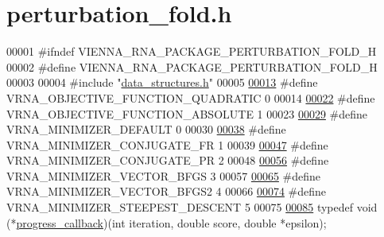 \hypertarget{perturbation__fold_8h_source}{\section{perturbation\+\_\+fold.\+h}
\label{perturbation__fold_8h_source}
}

\begin{DoxyCode}
00001 \textcolor{preprocessor}{#ifndef VIENNA\_RNA\_PACKAGE\_PERTURBATION\_FOLD\_H}
00002 \textcolor{preprocessor}{#define VIENNA\_RNA\_PACKAGE\_PERTURBATION\_FOLD\_H}
00003 
00004 \textcolor{preprocessor}{#include "\hyperlink{data__structures_8h}{data\_structures.h}"}
00005 
\hypertarget{perturbation__fold_8h_source_l00013}{}\hyperlink{group__soft__constraints_ga81e10993d1ae728e4e02022b33155a12}{00013} \textcolor{preprocessor}{#define VRNA\_OBJECTIVE\_FUNCTION\_QUADRATIC 0}
00014 
\hypertarget{perturbation__fold_8h_source_l00022}{}\hyperlink{group__soft__constraints_gac070dfb9cafaeb14d5652bd9adf0f6b1}{00022} \textcolor{preprocessor}{#define VRNA\_OBJECTIVE\_FUNCTION\_ABSOLUTE 1}
00023 
\hypertarget{perturbation__fold_8h_source_l00029}{}\hyperlink{group__soft__constraints_gae5126200d80dbb282f46083fffc606bf}{00029} \textcolor{preprocessor}{#define VRNA\_MINIMIZER\_DEFAULT 0}
00030 
\hypertarget{perturbation__fold_8h_source_l00038}{}\hyperlink{group__soft__constraints_gab1d89db58e8c497795a5005f5dbc8c4a}{00038} \textcolor{preprocessor}{#define VRNA\_MINIMIZER\_CONJUGATE\_FR 1}
00039 
\hypertarget{perturbation__fold_8h_source_l00047}{}\hyperlink{group__soft__constraints_ga5aaeafe1b0aa77a5cda18943ff94b02f}{00047} \textcolor{preprocessor}{#define VRNA\_MINIMIZER\_CONJUGATE\_PR 2}
00048 
\hypertarget{perturbation__fold_8h_source_l00056}{}\hyperlink{group__soft__constraints_ga9be8a702cddf58235571ace11cc41b22}{00056} \textcolor{preprocessor}{#define VRNA\_MINIMIZER\_VECTOR\_BFGS 3}
00057 
\hypertarget{perturbation__fold_8h_source_l00065}{}\hyperlink{group__soft__constraints_ga7b0a65c6c92fa1d8012383ba9d3dcb4f}{00065} \textcolor{preprocessor}{#define VRNA\_MINIMIZER\_VECTOR\_BFGS2 4}
00066 
\hypertarget{perturbation__fold_8h_source_l00074}{}\hyperlink{group__soft__constraints_ga9ecd2144c2ebed7533233da3986521b0}{00074} \textcolor{preprocessor}{#define VRNA\_MINIMIZER\_STEEPEST\_DESCENT 5}
00075 
\hypertarget{perturbation__fold_8h_source_l00085}{}\hyperlink{group__soft__constraints_gafd57325a0fa4307cd72f933107f9d493}{00085} \textcolor{keyword}{typedef} void (*\hyperlink{group__soft__constraints_gafd57325a0fa4307cd72f933107f9d493}{progress\_callback})(\textcolor{keywordtype}{int} iteration, \textcolor{keywordtype}{double} score, \textcolor{keywordtype}{double} *epsilon);

\end{DoxyCode}
